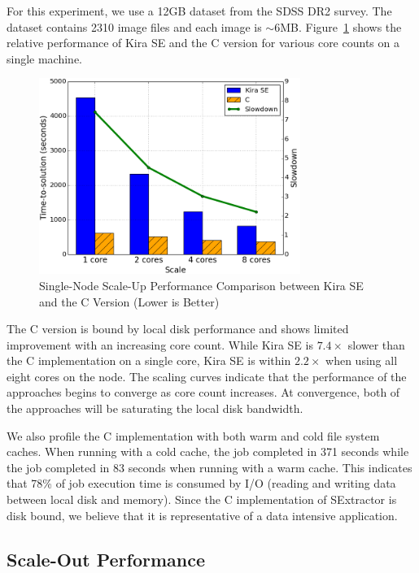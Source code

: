 \documentclass[conference]{IEEEtran}
\newcommand{\up}{\vspace*{-1em}}
\begin{document}
For this experiment, we use a 12GB dataset from the SDSS DR2 survey. The dataset contains
2310 image files and each image is $\sim$6MB.
Figure~\ref{fig:scaleup} shows the relative
performance of Kira SE and the C version for various core counts on a single machine.

\begin{figure}[h]
	\begin{center}
		\includegraphics[width=85mm]{pictures/scaleup}
		\caption{Single-Node Scale-Up Performance Comparison between Kira SE and the C Version (Lower is Better)
		\label{fig:scaleup}}
		\up\up
  	\end{center}
\end{figure}

The C version is bound by local disk performance and shows limited improvement with
an increasing core count. While Kira SE is $7.4\times$ slower than the C implementation
on a single core, Kira SE is within $2.2\times$ when using all eight cores on the node.
The scaling curves indicate that the performance of the approaches begins to converge
as core count increases. At convergence, both of the approaches will be saturating the local
disk bandwidth.

We also profile the C implementation with both warm and cold file system caches. When running with a
cold cache, the job completed in 371 seconds while the job completed in 83 seconds when
running with a warm cache. This indicates that 78\% of job execution time is consumed by
I/O (reading and writing data between local disk and memory). Since the C implementation of
SExtractor is disk bound, we believe that it is representative of a data intensive application. 

\subsection{Scale-Out Performance}
\label{sec:Performance-scaleout}
\end{document}
